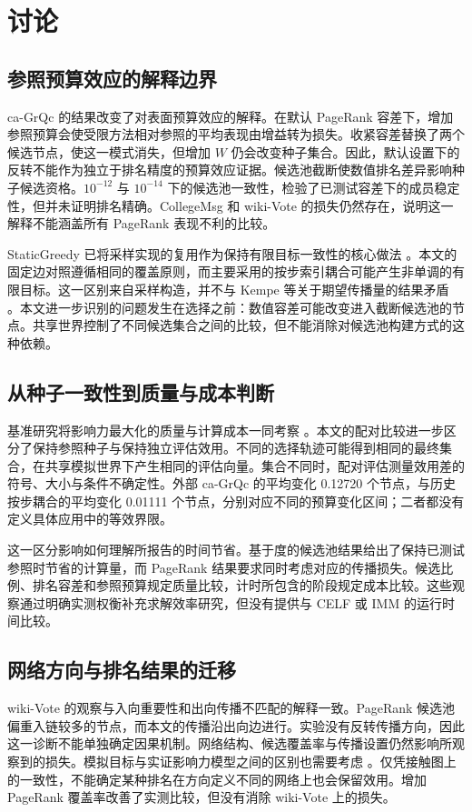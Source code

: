 \documentclass[smallextended]{svjour3}
\begin{document}
\section{讨论}
\subsection{参照预算效应的解释边界}
ca-GrQc 的结果改变了对表面预算效应的解释。在默认 PageRank 容差下，增加参照预算会使受限方法相对参照的平均表现由增益转为损失。收紧容差替换了两个候选节点，使这一模式消失，但增加 $W$ 仍会改变种子集合。因此，默认设置下的反转不能作为独立于排名精度的预算效应证据。候选池截断使数值排名差异影响种子候选资格。$10^{-12}$ 与 $10^{-14}$ 下的候选池一致性，检验了已测试容差下的成员稳定性，但并未证明排名精确。CollegeMsg 和 wiki-Vote 的损失仍然存在，说明这一解释不能涵盖所有 PageRank 表现不利的比较。

StaticGreedy 已将采样实现的复用作为保持有限目标一致性的核心做法 \cite{ref8}。本文的固定边对照遵循相同的覆盖原则，而主要采用的按步索引耦合可能产生非单调的有限目标。这一区别来自采样构造，并不与 Kempe 等关于期望传播量的结果矛盾 \cite{ref1}。本文进一步识别的问题发生在选择之前：数值容差可能改变进入截断候选池的节点。共享世界控制了不同候选集合之间的比较，但不能消除对候选池构建方式的这种依赖。

\subsection{从种子一致性到质量与成本判断}
基准研究将影响力最大化的质量与计算成本一同考察 \cite{ref16}。本文的配对比较进一步区分了保持参照种子与保持独立评估效用。不同的选择轨迹可能得到相同的最终集合，在共享模拟世界下产生相同的评估向量。集合不同时，配对评估测量效用差的符号、大小与条件不确定性。外部 ca-GrQc 的平均变化 0.12720 个节点，与历史按步耦合的平均变化 0.01111 个节点，分别对应不同的预算变化区间；二者都没有定义具体应用中的等效界限。

这一区分影响如何理解所报告的时间节省。基于度的候选池结果给出了保持已测试参照时节省的计算量，而 PageRank 结果要求同时考虑对应的传播损失。候选比例、排名容差和参照预算规定质量比较，计时所包含的阶段规定成本比较。这些观察通过明确实测权衡补充求解效率研究，但没有提供与 CELF 或 IMM 的运行时间比较。

\subsection{网络方向与排名结果的迁移}
wiki-Vote 的观察与入向重要性和出向传播不匹配的解释一致。PageRank 候选池偏重入链较多的节点，而本文的传播沿出向边进行。实验没有反转传播方向，因此这一诊断不能单独确定因果机制。网络结构、候选覆盖率与传播设置仍然影响所观察到的损失。模拟目标与实证影响力模型之间的区别也需要考虑 \cite{ref15}。仅凭接触图上的一致性，不能确定某种排名在方向定义不同的网络上也会保留效用。增加 PageRank 覆盖率改善了实测比较，但没有消除 wiki-Vote 上的损失。
\end{document}
